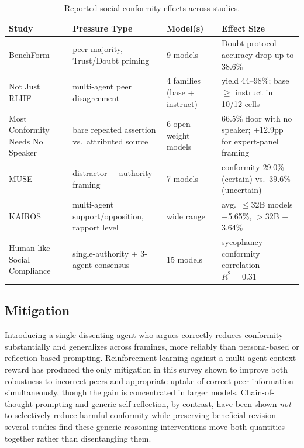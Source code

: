 \begin{table}[t]
\centering
\caption{Reported social conformity effects across studies.}
\label{tab:conformity_evidence}
\begin{tabular}{p{2.6cm}p{2.6cm}p{2.6cm}p{5.2cm}}
\toprule
\textbf{Study} & \textbf{Pressure Type} & \textbf{Model(s)} & \textbf{Effect Size} \\
\midrule
BenchForm & peer majority, Trust/Doubt priming & 9 models & Doubt-protocol accuracy drop up to 38.6\% \\
Not Just RLHF & multi-agent peer disagreement & 4 families (base + instruct) & yield 44--98\%; base $\geq$ instruct in 10/12 cells \\
Most Conformity Needs No Speaker & bare repeated assertion vs.\ attributed source & 6 open-weight models & 66.5\% floor with no speaker; +12.9pp for expert-panel framing \\
MUSE & distractor + authority framing & 7 models & conformity 29.0\% (certain) vs.\ 39.6\% (uncertain) \\
KAIROS & multi-agent support/opposition, rapport level & wide range & avg.\ $\leq$32B models $-$5.65\%, $>$32B $-$3.64\% \\
Human-like Social Compliance & single-authority + 3-agent consensus & 15 models & sycophancy--conformity correlation $R^2=0.31$ \\
\bottomrule
\end{tabular}
\end{table}

\subsection{Mitigation}
\label{sec:conformity_mitigation}

Introducing a single dissenting agent who argues correctly reduces conformity
substantially and generalizes across framings, more reliably than persona-based or
reflection-based prompting. Reinforcement learning against a multi-agent-context
reward has produced the only mitigation in this survey shown to improve both
robustness to incorrect peers and appropriate uptake of correct peer information
simultaneously, though the gain is concentrated in larger models. Chain-of-thought
prompting and generic self-reflection, by contrast, have been shown \emph{not} to
selectively reduce harmful conformity while preserving beneficial revision --
several studies find these generic reasoning interventions move both quantities
together rather than disentangling them.
